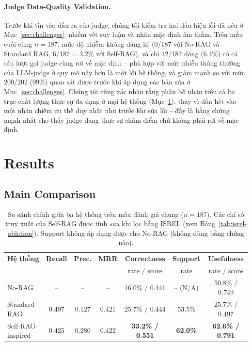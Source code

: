 \documentclass[11pt]{article}
\begin{document}
\paragraph{Judge Data-Quality Validation.} Trước khi tin vào đầu ra của judge, chúng tôi kiểm tra hai dấu hiệu lỗi đã nêu ở Mục~\ref{sec:challenges}: nhiễm vết suy luận và nhãn mặc định âm thầm. Trên mẫu cuối cùng $n=187$, mức độ nhiễm không đáng kể (0/187 với No-RAG và Standard RAG, 6/187 = 3.2\% với Self-RAG), và chỉ 12/187 dòng (6.4\%) có cả sáu lượt gọi judge cùng rơi về mặc định -- phù hợp với mức nhiễu thông thường của LLM-judge ở quy mô này hơn là một lỗi hệ thống, và giảm mạnh so với mức 200/202 (99\%) quan sát được trước khi áp dụng các bản sửa ở Mục~\ref{sec:challenges}. Chúng tôi cũng xác nhận rằng phân bố nhãn trên cả ba trục chất lượng thực sự đa dạng ở mọi hệ thống (Mục~\ref{sec:results}), thay vì dồn hết vào một nhãn chiếm ưu thế duy nhất như trước khi sửa lỗi -- đây là bằng chứng mạnh nhất cho thấy judge đang thực sự chấm điểm chứ không phải rơi về mặc định.

\section{Results}
\label{sec:results}

\subsection{Main Comparison}

\begin{table}[t]
\centering
\small
\begin{tabular}{@{}lcccccc@{}}
\toprule
\textbf{Hệ thống} & \textbf{Recall} & \textbf{Prec.} & \textbf{MRR} & \textbf{Correctness} & \textbf{Support} & \textbf{Usefulness} \\
 & & & & rate / score & rate & rate / score \\
\midrule
No-RAG & -- & -- & -- & 16.0\% / 0.441 & -- (N/A) & 50.8\% / 0.749 \\
Standard RAG & 0.497 & 0.127 & 0.421 & 25.7\% / 0.444 & 53.5\% & 25.7\% / 0.497 \\
Self-RAG-inspired & 0.425 & 0.280 & 0.422 & \textbf{33.2\% / 0.551} & \textbf{62.0\%} & \textbf{62.6\% / 0.791} \\
\bottomrule
\end{tabular}
\caption{So sánh chính giữa ba hệ thống trên mẫu đánh giá chung ($n=187$). Các chỉ số truy xuất của Self-RAG được tính \emph{sau} khi lọc bằng \textsc{ISREL} (xem Bảng~\ref{tab:isrel-ablation}). Support không áp dụng được cho No-RAG (không dùng bằng chứng nào).}
\label{tab:main-results}
\end{table}
\end{document}
